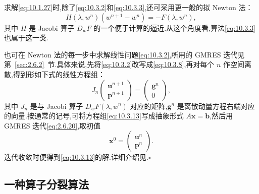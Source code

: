 \begin{note}
求解\eqref{eq:10.1.27}时,除了\eqref{eq:10.3.2}和\eqref{eq:10.3.3},还可采用更一般的拟 Newton 法：
\[
  H(\lambda,w^n)(w^{n+1}-w^n)=-F(\lambda,w^n),
\]
其中 \(H\) 是 Jacobi 算子 \(D_wF\) 的一个便于计算的逼近.从这个角度看,算法\eqref{eq:10.3.3}也属于这一类.

也可在 Newton 法的每一步中求解线性问题\eqref{eq:10.3.2},所用的 GMRES 迭代见第~\ref{sec:2.6.2}~节.具体来说,先将\eqref{eq:10.3.2}改写成\eqref{eq:10.3.8},再对每个 \(n\) 作空间离散,得到形如下式的线性方程组：
\begin{equation}\label{eq:10.3.13}
  J_n\begin{pmatrix}\boldsymbol{u}^{n+1}\\\boldsymbol{p}^{n+1}\end{pmatrix}
       =\begin{pmatrix}\boldsymbol{g}^n\\0\end{pmatrix},
\end{equation}
其中 \(J_n\) 是与 Jacobi 算子 \(D_wF(\lambda,w^n)\) 对应的矩阵,\(\boldsymbol{g}^n\) 是离散动量方程右端对应的向量.按通常的记号,可将方程组\eqref{eq:10.3.13}写成抽象形式 \(A\boldsymbol{x}=\boldsymbol{b}\),然后用 GMRES 迭代\eqref{eq:2.6.20},取初值
\[
  \boldsymbol{x}^0=\begin{pmatrix}\boldsymbol{u}^n\\\boldsymbol{p}^n\end{pmatrix}.
\]
迭代收敛时便得到\eqref{eq:10.3.13}的解.详细介绍见.\hfill\(\square\)
\end{note}

\subsection{一种算子分裂算法}\label{sec:10.3.2}

